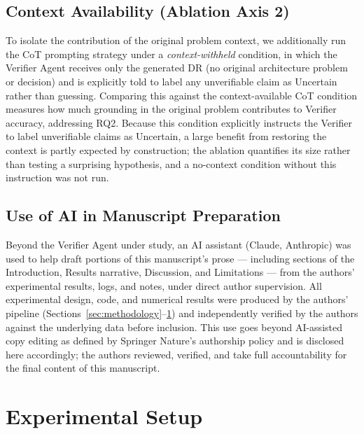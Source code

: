 \documentclass[runningheads]{llncs}
\begin{document}
\subsection{Context Availability (Ablation Axis 2)}
To isolate the contribution of the original problem context, we additionally run the CoT prompting strategy under a \emph{context-withheld} condition, in which the Verifier Agent receives only the generated DR (no original architecture problem or decision) and is explicitly told to label any unverifiable claim as Uncertain rather than guessing. Comparing this against the context-available CoT condition measures how much grounding in the original problem contributes to Verifier accuracy, addressing RQ2. Because this condition explicitly instructs the Verifier to label unverifiable claims as Uncertain, a large benefit from restoring the context is partly expected by construction; the ablation quantifies its size rather than testing a surprising hypothesis, and a no-context condition without this instruction was not run.

\subsection{Use of AI in Manuscript Preparation}
Beyond the Verifier Agent under study, an AI assistant (Claude, Anthropic) was used to help draft portions of this manuscript's prose --- including sections of the Introduction, Results narrative, Discussion, and Limitations --- from the authors' experimental results, logs, and notes, under direct author supervision. All experimental design, code, and numerical results were produced by the authors' pipeline (Sections~\ref{sec:methodology}--\ref{sec:expsetup}) and independently verified by the authors against the underlying data before inclusion. This use goes beyond AI-assisted copy editing as defined by Springer Nature's authorship policy and is disclosed here accordingly; the authors reviewed, verified, and take full accountability for the final content of this manuscript.


\section{Experimental Setup}
\label{sec:expsetup}
\end{document}
